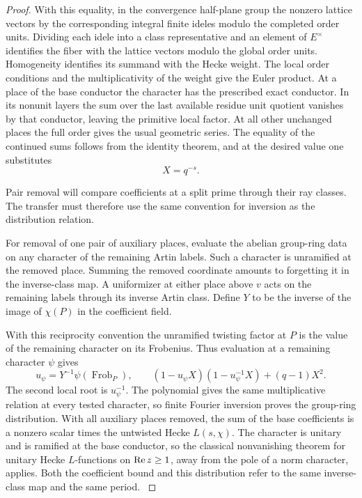 \begin{proof}
With this equality,
in the convergence half-plane group the nonzero lattice
vectors by the corresponding integral finite ideles
modulo the completed order units. Dividing each
idele into a class representative and an element of
\(E^\times\) identifies the fiber with the lattice vectors
modulo the global order units. Homogeneity identifies
its summand with the Hecke weight. The local
order conditions and the multiplicativity of the weight
give the Euler product. At a place of the base conductor
the character has the prescribed exact conductor.
In its nonunit layers the sum over the last available
residue unit quotient vanishes by that conductor, leaving
the primitive local factor. At all other unchanged
places the full order gives the usual geometric series.
The equality of the continued sums follows from the
identity theorem, and at the desired value one
substitutes
\[
 X=q^{-s}.
\]


Pair removal will compare coefficients at a split prime through their ray classes. The transfer must therefore use the same convention for inversion as the distribution relation.

For removal of one pair of auxiliary places, evaluate
the abelian group-ring data on any character of the
remaining Artin labels. Such a character is unramified
at the removed place. Summing the removed coordinate
amounts to forgetting it in the inverse-class map.
A uniformizer at either place above \(v\) acts on the
remaining labels through its inverse Artin class.
Define \(Y\) to be the inverse of the image of \(\chi(P)\)
in the coefficient field.

With this reciprocity convention the unramified twisting factor at \(P\) is
the value of the remaining character on its Frobenius.
Thus evaluation at a remaining character \(\psi\) gives
\[
 u_\psi=Y^{-1}\psi(\operatorname{Frob}_P),\qquad
 (1-u_\psi X)(1-u_\psi^{-1}X)+(q-1)X^2 .
\]
The second local root is \(u_\psi^{-1}\).
The polynomial gives the same
multiplicative relation at every tested character, so
finite Fourier inversion proves the group-ring
distribution. With all auxiliary places removed, the
sum of the base coefficients is a nonzero scalar times
the untwisted Hecke \(L(s,\chi)\). The character is unitary
and is ramified at the base conductor, so the classical
nonvanishing theorem for unitary Hecke \(L\)-functions
on \(\operatorname{Re} z\ge1\), away from the pole of a norm
character, applies. Both the coefficient bound and this
distribution refer to the same inverse-class map and
the same period. \label{cor:toric-twist-5}
\end{proof}
